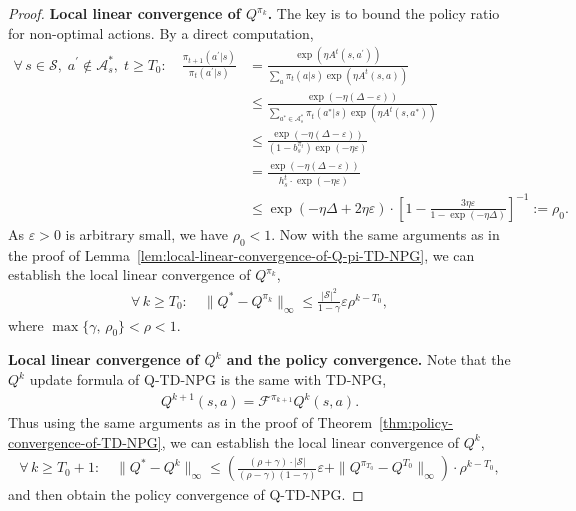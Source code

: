 \documentclass[10pt,a4paper]{amsart}
\newcommand{\calA}{\mathcal{A}}
\newcommand{\calF}{\mathcal{F}}
\newcommand{\calS}{\mathcal{S}}
\newcommand{\ls}{\left}
\newcommand{\rs}{\right}
\begin{document}
\begin{proof}
    \textbf{Local linear convergence of $Q^{\pi_k}$.} The key is to bound the policy ratio for non-optimal actions. By a direct computation,
    \begin{align*}
        \forall\, s\in\calS, \; a^\prime \not\in\calA^*_s, \; t\geq T_0: \quad \frac{\pi_{t+1}(a^\prime|s)}{\pi_t(a^\prime|s)} &= \frac{\exp (\eta A^t(s, a^\prime))}{\sum_a \pi_t(a|s) \exp(\eta A^t(s,a))} \\
        &\leq \frac{\exp(-\eta (\Delta - \varepsilon))}{\sum_{a^* \in\calA^*_s} \pi_t(a^*|s) \exp (\eta A^t(s,a^*))} \\
        &\leq \frac{\exp(-\eta (\Delta - \varepsilon))}{(1-b_s^{\pi_t}) \exp(-\eta\varepsilon)} \\
        &= \frac{\exp(-\eta (\Delta - \varepsilon))}{h_s^t \cdot \exp(-\eta\varepsilon)} \\
        &\leq \exp (-\eta\Delta + 2\eta\varepsilon) \cdot \ls[ 1 - \frac{3\eta\varepsilon}{1-\exp(-\eta\Delta)} \rs]^{-1} := \rho_0.
    \end{align*}
    As $\varepsilon > 0$ is arbitrary small, we have $\rho_0 < 1$. Now with the same arguments as in the proof of Lemma~\ref{lem:local-linear-convergence-of-Q-pi-TD-NPG}, we can establish the local linear convergence of $Q^{\pi_k}$,
    \begin{align*}
        \forall\, k \geq T_0: \quad \| Q^* - Q^{\pi_k} \|_\infty \leq \frac{|\calS|^2}{1-\gamma} \varepsilon \rho^{k-T_0},
    \end{align*}
    where $\max\{ \gamma, \, \rho_0 \} < \rho < 1$.

    \textbf{Local linear convergence of $Q^k$ and the policy convergence. } Note that the $Q^k$ update formula of Q-TD-NPG is the same with TD-NPG,
    \begin{align*}
        Q^{k+1}(s,a) = \calF^{\pi_{k+1}} Q^k(s,a).
    \end{align*}
    Thus using the same arguments as in the proof of Theorem~\ref{thm:policy-convergence-of-TD-NPG}, we can establish the local linear convergence of $Q^k$,
    \begin{align*}
        \forall\, k \geq T_0 + 1 : \quad \| Q^* - Q^k \|_\infty \leq \ls( \frac{(\rho+\gamma) \cdot |\calS|}{(\rho-\gamma) (1-\gamma)} \varepsilon + \| Q^{\pi_{T_0}} - Q^{T_0} \|_\infty \rs) \cdot \rho ^{k - T_0},
    \end{align*}
and then obtain the policy convergence of Q-TD-NPG.
\end{proof}
\end{document}
